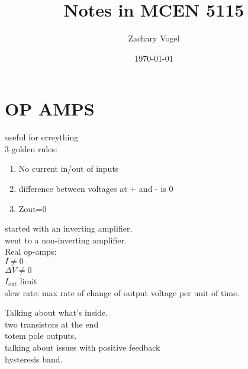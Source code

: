 \documentclass{article}
\author{Zachary Vogel}
\date{\today}
\title{Notes in MCEN 5115}
\begin{document}
\maketitle


\section*{OP AMPS}
useful for erreything\\

3 golden rules:\\
\begin{enumerate}
    \item No current in/out of inputs
    \item difference between voltages at + and - is 0
    \item Zout=0
\end{enumerate}

started with an inverting amplifier.\\

went to a non-inverting amplifier.\\


Real op-amps:\\
$I\neq 0$\\
$\Delta V\neq 0$\\
$I_{\text{out}}$ limit\\
slew rate: max rate of change of output voltage per unit of time.


Talking about what's inside.\\
two transistors at the end\\
totem pole outputs.\\


talking about issues with positive feedback\\

hysteresis band.\\
\end{document}
